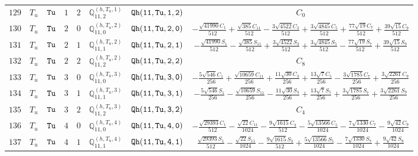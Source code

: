 \documentclass[fleqn,8pt]{jsarticle}
\begin{document}
\begin{table}[ht!]
\begin{center}
\begin{tabular}{cccccccc}
$ 129 $ & $ T_{u} $ & $ {\tt Tu} $ & $ 1 $ & $ 2 $ & $ \mathbb{Q}_{11,2}^{(h,T_{u},1)} $ & $ {\tt Qh(11,Tu,1,2)} $ & $ C_{0} $ \\
$ 130 $ & $ T_{u} $ & $ {\tt Tu} $ & $ 2 $ & $ 0 $ & $ \mathbb{Q}_{11,0}^{(h,T_{u},2)} $ & $ {\tt Qh(11,Tu,2,0)} $ & $ - \frac{\sqrt{41990} C_{1}}{512} + \frac{\sqrt{385} C_{11}}{512} - \frac{3 \sqrt{4522} C_{3}}{512} + \frac{3 \sqrt{4845} C_{5}}{512} + \frac{77 \sqrt{19} C_{7}}{512} + \frac{39 \sqrt{15} C_{9}}{512} $ \\
$ 131 $ & $ T_{u} $ & $ {\tt Tu} $ & $ 2 $ & $ 1 $ & $ \mathbb{Q}_{11,1}^{(h,T_{u},2)} $ & $ {\tt Qh(11,Tu,2,1)} $ & $ - \frac{\sqrt{41990} S_{1}}{512} - \frac{\sqrt{385} S_{11}}{512} + \frac{3 \sqrt{4522} S_{3}}{512} + \frac{3 \sqrt{4845} S_{5}}{512} - \frac{77 \sqrt{19} S_{7}}{512} + \frac{39 \sqrt{15} S_{9}}{512} $ \\
$ 132 $ & $ T_{u} $ & $ {\tt Tu} $ & $ 2 $ & $ 2 $ & $ \mathbb{Q}_{11,2}^{(h,T_{u},2)} $ & $ {\tt Qh(11,Tu,2,2)} $ & $ C_{8} $ \\
$ 133 $ & $ T_{u} $ & $ {\tt Tu} $ & $ 3 $ & $ 0 $ & $ \mathbb{Q}_{11,0}^{(h,T_{u},3)} $ & $ {\tt Qh(11,Tu,3,0)} $ & $ - \frac{5 \sqrt{546} C_{1}}{256} + \frac{\sqrt{10659} C_{11}}{256} + \frac{11 \sqrt{30} C_{3}}{256} + \frac{13 \sqrt{7} C_{5}}{256} - \frac{3 \sqrt{1785} C_{7}}{256} + \frac{3 \sqrt{2261} C_{9}}{256} $ \\
$ 134 $ & $ T_{u} $ & $ {\tt Tu} $ & $ 3 $ & $ 1 $ & $ \mathbb{Q}_{11,1}^{(h,T_{u},3)} $ & $ {\tt Qh(11,Tu,3,1)} $ & $ - \frac{5 \sqrt{546} S_{1}}{256} - \frac{\sqrt{10659} S_{11}}{256} - \frac{11 \sqrt{30} S_{3}}{256} + \frac{13 \sqrt{7} S_{5}}{256} + \frac{3 \sqrt{1785} S_{7}}{256} + \frac{3 \sqrt{2261} S_{9}}{256} $ \\
$ 135 $ & $ T_{u} $ & $ {\tt Tu} $ & $ 3 $ & $ 2 $ & $ \mathbb{Q}_{11,2}^{(h,T_{u},3)} $ & $ {\tt Qh(11,Tu,3,2)} $ & $ C_{4} $ \\
$ 136 $ & $ T_{u} $ & $ {\tt Tu} $ & $ 4 $ & $ 0 $ & $ \mathbb{Q}_{11,0}^{(h,T_{u},4)} $ & $ {\tt Qh(11,Tu,4,0)} $ & $ - \frac{\sqrt{29393} C_{1}}{512} - \frac{\sqrt{22} C_{11}}{1024} - \frac{9 \sqrt{1615} C_{3}}{512} - \frac{5 \sqrt{13566} C_{5}}{1024} - \frac{7 \sqrt{1330} C_{7}}{1024} - \frac{9 \sqrt{42} C_{9}}{1024} $ \\
$ 137 $ & $ T_{u} $ & $ {\tt Tu} $ & $ 4 $ & $ 1 $ & $ \mathbb{Q}_{11,1}^{(h,T_{u},4)} $ & $ {\tt Qh(11,Tu,4,1)} $ & $ \frac{\sqrt{29393} S_{1}}{512} - \frac{\sqrt{22} S_{11}}{1024} - \frac{9 \sqrt{1615} S_{3}}{512} + \frac{5 \sqrt{13566} S_{5}}{1024} - \frac{7 \sqrt{1330} S_{7}}{1024} + \frac{9 \sqrt{42} S_{9}}{1024} $ \\

\end{tabular}
\end{center}
\end{table}
\end{document}
